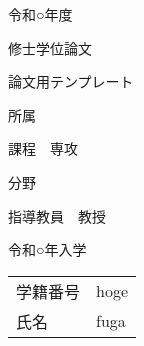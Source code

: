 \documentclass[main]{subfiles}
\begin{document}
\begin{titlepage}
    \centering

    {\Huge 令和○年度}
    \vspace{15truept}

    {\Huge 修士学位論文}
    \vspace*{60truept}

    {\Huge 論文用テンプレート}
    \vspace{60truept}

    {\Huge 所属}
    \vspace{15truept}

    {\Huge 課程　専攻}
    \vspace{15truept}

    {\Huge 分野}
    \vspace{60truept}

    {\Huge 指導教員　教授}
    \vspace{60truept}

    {\Huge 令和○年入学}
    \vspace{15truept}

    \Huge
    \begin{tabular}{ll}
        学籍番号 & hoge \\
        氏名   & fuga \\
    \end{tabular}

\end{titlepage}
\end{document}
